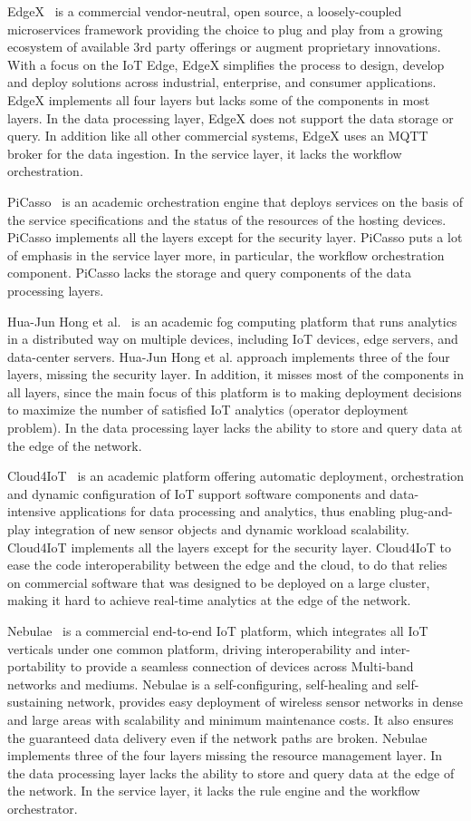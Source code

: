EdgeX~\cite{edgex} is a commercial vendor-neutral, open source, a loosely-coupled microservices framework providing the choice to plug and play from a growing ecosystem of available 3rd party offerings or augment proprietary innovations. With a focus on the IoT Edge, EdgeX simplifies the process to design, develop and deploy solutions across industrial, enterprise, and consumer applications. EdgeX implements all four layers but lacks some of the components in most layers. In the data processing layer, EdgeX does not support the data storage or query. In addition like all other commercial systems, EdgeX uses an MQTT broker for the data ingestion. In the service layer, it lacks the workflow orchestration. 

PiCasso~\cite{8071529} is an academic orchestration engine that deploys services on the basis of the service specifications and the status of the resources of the hosting devices. PiCasso implements all the layers except for the security layer. PiCasso puts a lot of emphasis in the service layer more, in particular, the workflow orchestration component. PiCasso lacks the storage and query components of the data processing layers.

Hua-Jun Hong et al.~\cite{8241101} is an academic fog computing platform that runs analytics in a distributed way on multiple devices, including IoT devices, edge servers, and data-center servers. Hua-Jun Hong et al. approach implements three of the four layers, missing the security layer. In addition, it misses most of the components in all layers, since the main focus of this platform is to making deployment decisions to maximize the number of satisfied IoT analytics (operator deployment problem). In the data processing layer lacks the ability to store and query data at the edge of the network.

Cloud4IoT~\cite{7830723} is an academic platform offering automatic deployment, orchestration and dynamic configuration of IoT support software components and data-intensive applications for data processing and analytics, thus enabling plug-and-play integration of new sensor objects and dynamic workload scalability. Cloud4IoT implements all the layers except for the security layer. Cloud4IoT to ease the code interoperability between the edge and the cloud, to do that relies on commercial software that was designed to be deployed on a large cluster, making it hard to achieve real-time analytics at the edge of the network.

Nebulae~\cite{Nebulae} is a commercial end-to-end IoT platform, which integrates all IoT verticals under one common platform, driving interoperability and inter-portability to provide a seamless connection of devices across Multi-band networks and mediums. Nebulae is a self-configuring, self-healing and self-sustaining network, provides easy deployment of wireless sensor networks in dense and large areas with scalability and minimum maintenance costs. It also ensures the guaranteed data delivery even if the network paths are broken. Nebulae implements three of the four layers missing the resource management layer. In the data processing layer lacks the ability to store and query data at the edge of the network. In the service layer, it lacks the rule engine and the workflow orchestrator.

